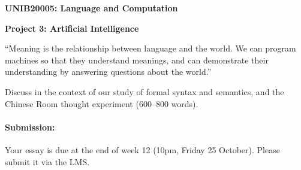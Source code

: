 \documentclass[a4paper,11pt]{article}
\begin{document}
\centerline{\LARGE\bf UNIB20005: Language and Computation}\vspace{2ex}

\centerline{\large\bf Project 3: Artificial Intelligence}\vspace{2ex}

``Meaning is the relationship between language and the world.
We can program machines so that they understand meanings, and
can demonstrate their understanding by answering questions about the world.''

Discuss in the context of our study of formal syntax and semantics, and the Chinese Room thought experiment (600--800 words).

\paragraph{Submission:}
Your essay is due at the end of week 12 (10pm, Friday 25 October). Please submit it via the LMS.
\end{document}
